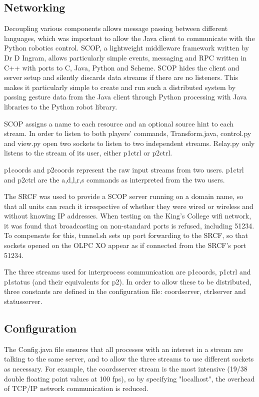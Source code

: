 \documentclass[12pt,a4,notitlepage]{report}
\renewcommand{\_}{\texttt{\symbol{95}}}
\newcommand{\<}{\texttt{\symbol{60}}}
\renewcommand{\>}{\texttt{\symbol{62}}}
\begin{document}
\subsection{Networking}

Decoupling various components allows message passing between different languages, which was important to allow the Java client to communicate with the Python robotics control. SCOP, a lightweight middleware framework written by Dr D Ingram, allows particularly simple events, messaging and RPC written in C++ with ports to C, Java, Python and Scheme. SCOP hides the client and server setup and silently discards data streams if there are no listeners. This makes it particularly simple to create and run such a distributed system by passing gesture data from the Java client through Python processing with Java libraries to the Python robot library.

SCOP assigns a name to each resource and an optional source hint to each stream. In order to listen to both players' commands, Transform.java, control.py and view.py open two sockets to listen to two independent streams. Relay.py only listens to the stream of its user, either p1ctrl or p2ctrl.

p1coords and p2coords represent the raw input streams from two users.
p1ctrl and p2ctrl are the {a,d,l,r,s} commands as interpreted from the two users.

The SRCF was used to provide a SCOP server running on a domain name, so that all units can reach it irrespective of whether they were wired or wireless and without knowing IP addresses. When testing on the King's College wifi network, it was found that broadcasting on non-standard ports is refused, including 51234. To compensate for this, tunnel.sh sets up port forwarding to the SRCF, so that sockets opened on the OLPC XO appear as if connected from the SRCF's port 51234.

The three streams used for interprocess communication are p1coords, p1ctrl and p1status (and their equivalents for p2). In order to allow these to be distributed, three constants are defined in the configuration file: coordserver, ctrlserver and statusserver. 

\subsection{Configuration}

The Config.java file ensures that all processes with an interest in a stream are talking to the same server, and to allow the three streams to use different sockets as necessary. For example, the coordsserver stream is the most intensive (19/38 double floating point values at 100 fps), so by specifying "localhost", the overhead of TCP/IP network communication is reduced.
\end{document}
